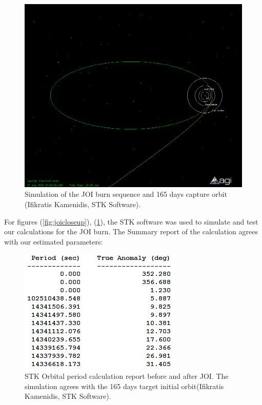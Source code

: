 \begin{figure}[htb]
\centering
\includegraphics[scale=0.4]{figures/Orbiter/JOIfull.png}
\caption{Simulation of the JOI burn sequence and 165 days capture orbit (Ifikratis Kamenidis, STK Software).}
\label{fig:joifull}
\end{figure}

For figures (\ref{fig:joicloseup}), (\ref{fig:joifull}), the STK software was used to simulate and test our calculations for the JOI burn. The Summary report of the calculation agrees with our estimated parameters:

\begin{figure}[htb]
\centering
\includegraphics[scale=0.5]{figures/Orbiter/captorb.png}
\caption{STK Orbital period calculation report before and after JOI. The simulation agrees with the 165 days target initial orbit(Ifikratis Kamenidis, STK Software).}
\end{figure}

